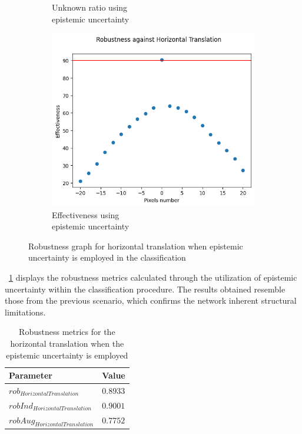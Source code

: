 \begin{figure}[h]
\begin{subfigure}{.33\textwidth}
		\caption{Unknown ratio using \\ epistemic uncertainty}
		\label{fig:ht_eu_unkn}
	\end{subfigure}%
	\begin{subfigure}{.33\textwidth}
		\centering
		\includegraphics[width=0.9\linewidth]{ImageFiles/EvalBNN/HT/EU/eff}
		\caption{Effectiveness using \\ epistemic uncertainty}
		\label{fig:ht_eu_eff}
	\end{subfigure}
	\caption{Robustness graph for horizontal translation when epistemic uncertainty is employed in the classification}
	\label{fig:ht_eu}
\end{figure}

\Tab~\ref{table:rob_ht_eu} displays the robustness metrics calculated through the utilization of epistemic uncertainty within the classification procedure. The results obtained resemble those from the previous scenario, which confirms the network inherent structural limitations.

\begin{table}[h]
	\centering
	\begin{tabular}{|| l | l ||} 
		\hline
		\textbf{Parameter} & \textbf{Value} \\
		\hline
		\hline
		$rob_{HorizontalTranslation}$ & $0.8933$ \\
		$robInd_{HorizontalTranslation}$ & $0.9001$ \\
		$robAug_{HorizontalTranslation}$ & $0.7752$ \\	
		\hline
	\end{tabular}	
	\caption{Robustness metrics for the horizontal translation when the epistemic uncertainty is employed}
	\label{table:rob_ht_eu}
\end{table}

